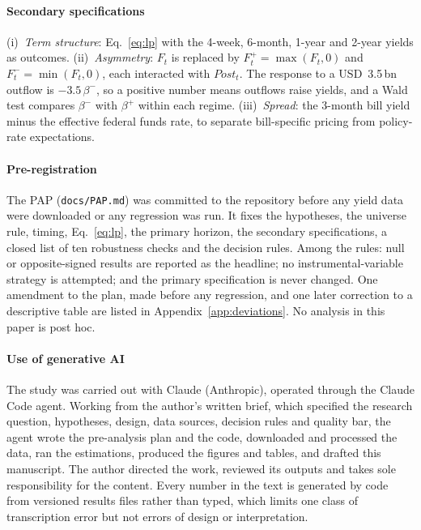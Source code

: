 \paragraph*{Secondary specifications} (i)~\emph{Term structure}: Eq.~\eqref{eq:lp} with the 4-week, 6-month, 1-year and 2-year yields as outcomes. (ii)~\emph{Asymmetry}: $F_t$ is replaced by $F^+_t=\max(F_t,0)$ and $F^-_t=\min(F_t,0)$, each interacted with $\mathit{Post}_t$. The response to a USD~3.5\,bn outflow is $-3.5\,\beta^-$, so a positive number means outflows raise yields, and a Wald test compares $\beta^-$ with $\beta^+$ within each regime. (iii)~\emph{Spread}: the 3-month bill yield minus the effective federal funds rate, to separate bill-specific pricing from policy-rate expectations.

\paragraph*{Pre-registration} The PAP (\texttt{docs/PAP.md}) was committed to the repository before any yield data were downloaded or any regression was run. It fixes the hypotheses, the universe rule, timing, Eq.~\eqref{eq:lp}, the primary horizon, the secondary specifications, a closed list of ten robustness checks and the decision rules. Among the rules: null or opposite-signed results are reported as the headline; no instrumental-variable strategy is attempted; and the primary specification is never changed. One amendment to the plan, made before any regression, and one later correction to a descriptive table are listed in Appendix~\ref{app:deviations}. No analysis in this paper is post hoc.

\paragraph*{Use of generative AI} The study was carried out with Claude (Anthropic), operated through the Claude Code agent. Working from the author's written brief, which specified the research question, hypotheses, design, data sources, decision rules and quality bar, the agent wrote the pre-analysis plan and the code, downloaded and processed the data, ran the estimations, produced the figures and tables, and drafted this manuscript. The author directed the work, reviewed its outputs and takes sole responsibility for the content. Every number in the text is generated by code from versioned results files rather than typed, which limits one class of transcription error but not errors of design or interpretation.
